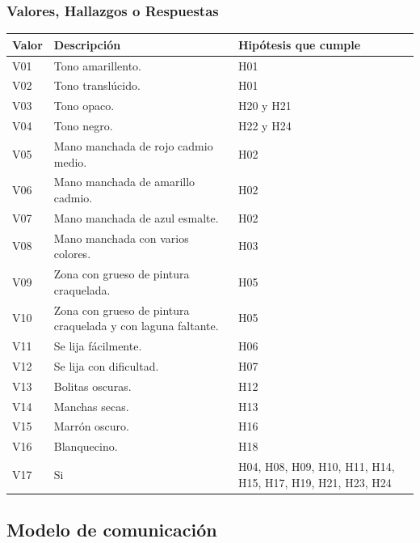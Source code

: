 \documentclass[a4paper,11pt]{article}
\begin{document}
			\subsubsection{Valores, Hallazgos o Respuestas}
			\begin{center}
				\begin{tabular}{| p{2cm} | p{6cm} | p{3cm} |}
					\hline
					\cellcolor[RGB]{224,233,250}\textbf{Valor} &
					\cellcolor[RGB]{224,233,250}\textbf{Descripción} &
					\cellcolor[RGB]{224,233,250}\textbf{Hipótesis que cumple}\\
					\hline
V01 & Tono amarillento. & H01\\
					\hline
V02 & Tono translúcido. & H01\\
					\hline
V03 & Tono opaco. & H20 y H21\\
					\hline
V04 & Tono negro. & H22 y H24\\
					\hline
V05 & Mano manchada de rojo cadmio medio. & H02\\
					\hline
V06 & Mano manchada de amarillo cadmio. & H02\\
					\hline
V07 & Mano manchada de azul esmalte. & H02\\
					\hline
V08 & Mano manchada con varios colores. & H03\\
					\hline
V09 & Zona con grueso de pintura craquelada. & H05\\
					\hline
V10 & Zona con grueso de pintura craquelada y con laguna faltante. & H05\\
					\hline
V11 & Se lija fácilmente. & H06\\
					\hline
V12 & Se lija con dificultad. & H07\\
					\hline
V13 & Bolitas oscuras. & H12\\
					\hline
V14 & Manchas secas. & H13\\
					\hline
V15 & Marrón oscuro. & H16\\
					\hline
V16 & Blanquecino. & H18\\
					\hline
V17 & Si & H04, H08, H09, H10, H11, H14, H15, H17, H19, H21, H23, H24\\
					\hline
				\end{tabular}
			\end{center}
		\newpage
		\subsection{Modelo de comunicación}
\end{document}
